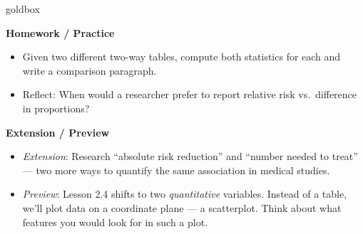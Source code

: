 \documentclass[10pt]{article}
\begin{document}
\begin{skillbox}{goldbox}
\begin{minipage}[t]{0.48\linewidth}
    \textbf{Homework / Practice}
    \begin{itemize}
        \item Given two different two-way tables, compute both statistics for each and write a comparison paragraph.
        \item Reflect: When would a researcher prefer to report relative risk vs.\ difference in proportions?
    \end{itemize}
\end{minipage}
\hfill
\begin{minipage}[t]{0.48\linewidth}
    \textbf{Extension / Preview}
    \begin{itemize}
        \item \textit{Extension}: Research ``absolute risk reduction'' and ``number needed to treat'' --- two more ways to quantify the same association in medical studies.
        \item \textit{Preview}: Lesson 2.4 shifts to two \textit{quantitative} variables. Instead of a table, we'll plot data on a coordinate plane --- a scatterplot. Think about what features you would look for in such a plot.
    \end{itemize}
\end{minipage}
\end{skillbox}
\end{document}
